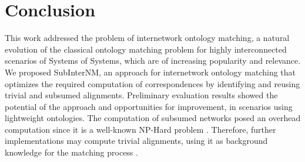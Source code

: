 \documentclass{llncs}
\begin{document}

\section{Conclusion} \label{sec:future}

This work addressed the problem of internetwork ontology matching, a natural evolution of the classical ontology matching problem for highly interconnected scenarios of Systems of Systems, which are of increasing popularity and relevance. 
We proposed SubInterNM, an approach for internetwork ontology matching that optimizes the required computation of correspondences by identifying and reusing trivial and subsumed alignments. Preliminary evaluation results showed the potential of the approach and opportunities for improvement, in scenarios using lightweight ontologies. The computation of subsumed networks posed an overhead computation since it is a well-known NP-Hard problem \cite{hsu1975algorithm}. Therefore, further implementations may compute trivial alignments, using it as background knowledge for the matching process \cite{shvaiko2013ontology}. 
\end{document}
